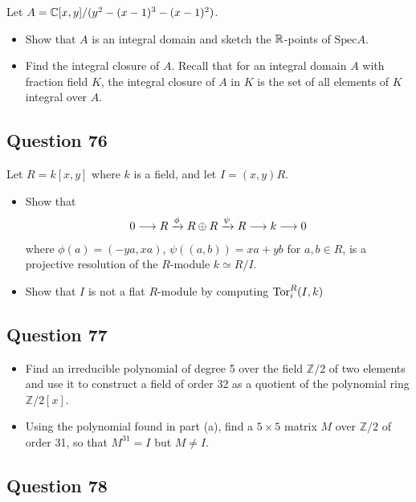 \documentclass[12pt]{article}
\providecommand{\tightlist}{%
  \setlength{\itemsep}{0pt}\setlength{\parskip}{0pt}}
\begin{document}
Let \(A = {\mathbb{C}}[x,y]/(y^2-(x-1)^3 - (x-1)^2)\).

\begin{itemize}
\tightlist
\item
  Show that \(A\) is an integral domain and sketch the \({\mathbb{R}}\)-points of
  \(\text{Spec} A\).
\item
  Find the integral closure of \(A\). Recall that for an integral domain
  \(A\) with fraction field \(K\), the integral closure of \(A\) in
  \(K\) is the set of all elements of \(K\) integral over \(A\).
\end{itemize}

\hypertarget{question-76}{%
\subsection{Question 76}\label{question-76}}

Let \(R = k[x,y]\) where \(k\) is a field, and let \(I=(x,y)R\).

\begin{itemize}
\item
  Show that \begin{align*}
  0 \longrightarrow R \xrightarrow{\phi} R \oplus R \xrightarrow{\psi} R \longrightarrow k \longrightarrow 0
  \end{align*} where \(\phi(a) = (-ya,xa)\), \(\psi((a,b)) = xa+yb\) for
  \(a,b \in R\), is a projective resolution of the \(R\)-module
  \(k \simeq R/I\).
\item
  Show that \(I\) is not a flat \(R\)-module by computing
  \(\text{Tor}_i^R(I,k)\)
\end{itemize}

\hypertarget{question-77}{%
\subsection{Question 77}\label{question-77}}

\begin{itemize}
\tightlist
\item
  Find an irreducible polynomial of degree 5 over the field
  \(\mathbb Z/2\) of two elements and use it to construct a field of
  order 32 as a quotient of the polynomial ring \(\mathbb Z/2[x]\).
\item
  Using the polynomial found in part (a), find a \(5\times5\) matrix
  \(M\) over \(\mathbb Z/2\) of order 31, so that \(M^{31}=I\) but
  \(M\neq I\).
\end{itemize}

\hypertarget{question-78}{%
\subsection{Question 78}\label{question-78}}
\end{document}
